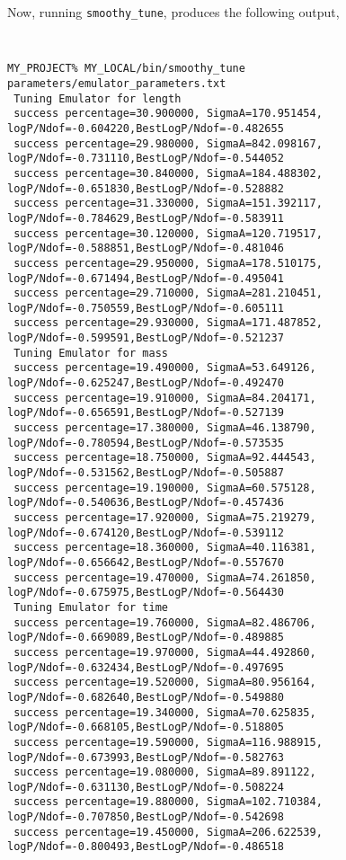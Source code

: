 \documentclass[UserManual.tex]{subfiles}
\begin{document}
Now, running {\tt smoothy\_tune}, produces the following output,

{\tt
\begin{verbatim}
MY_PROJECT% MY_LOCAL/bin/smoothy_tune parameters/emulator_parameters.txt
 Tuning Emulator for length
 success percentage=30.900000, SigmaA=170.951454, logP/Ndof=-0.604220,BestLogP/Ndof=-0.482655
 success percentage=29.980000, SigmaA=842.098167, logP/Ndof=-0.731110,BestLogP/Ndof=-0.544052
 success percentage=30.840000, SigmaA=184.488302, logP/Ndof=-0.651830,BestLogP/Ndof=-0.528882
 success percentage=31.330000, SigmaA=151.392117, logP/Ndof=-0.784629,BestLogP/Ndof=-0.583911
 success percentage=30.120000, SigmaA=120.719517, logP/Ndof=-0.588851,BestLogP/Ndof=-0.481046
 success percentage=29.950000, SigmaA=178.510175, logP/Ndof=-0.671494,BestLogP/Ndof=-0.495041
 success percentage=29.710000, SigmaA=281.210451, logP/Ndof=-0.750559,BestLogP/Ndof=-0.605111
 success percentage=29.930000, SigmaA=171.487852, logP/Ndof=-0.599591,BestLogP/Ndof=-0.521237
 Tuning Emulator for mass
 success percentage=19.490000, SigmaA=53.649126, logP/Ndof=-0.625247,BestLogP/Ndof=-0.492470
 success percentage=19.910000, SigmaA=84.204171, logP/Ndof=-0.656591,BestLogP/Ndof=-0.527139
 success percentage=17.380000, SigmaA=46.138790, logP/Ndof=-0.780594,BestLogP/Ndof=-0.573535
 success percentage=18.750000, SigmaA=92.444543, logP/Ndof=-0.531562,BestLogP/Ndof=-0.505887
 success percentage=19.190000, SigmaA=60.575128, logP/Ndof=-0.540636,BestLogP/Ndof=-0.457436
 success percentage=17.920000, SigmaA=75.219279, logP/Ndof=-0.674120,BestLogP/Ndof=-0.539112
 success percentage=18.360000, SigmaA=40.116381, logP/Ndof=-0.656642,BestLogP/Ndof=-0.557670
 success percentage=19.470000, SigmaA=74.261850, logP/Ndof=-0.675975,BestLogP/Ndof=-0.564430
 Tuning Emulator for time
 success percentage=19.760000, SigmaA=82.486706, logP/Ndof=-0.669089,BestLogP/Ndof=-0.489885
 success percentage=19.970000, SigmaA=44.492860, logP/Ndof=-0.632434,BestLogP/Ndof=-0.497695
 success percentage=19.520000, SigmaA=80.956164, logP/Ndof=-0.682640,BestLogP/Ndof=-0.549880
 success percentage=19.340000, SigmaA=70.625835, logP/Ndof=-0.668105,BestLogP/Ndof=-0.518805
 success percentage=19.590000, SigmaA=116.988915, logP/Ndof=-0.673993,BestLogP/Ndof=-0.582763
 success percentage=19.080000, SigmaA=89.891122, logP/Ndof=-0.631130,BestLogP/Ndof=-0.508224
 success percentage=19.880000, SigmaA=102.710384, logP/Ndof=-0.707850,BestLogP/Ndof=-0.542698
 success percentage=19.450000, SigmaA=206.622539, logP/Ndof=-0.800493,BestLogP/Ndof=-0.486518
\end{verbatim}
}
\end{document}
